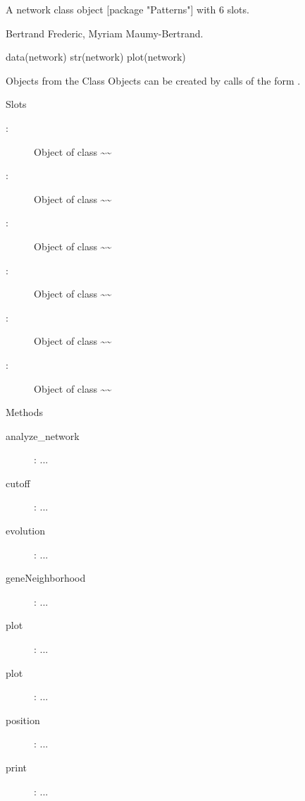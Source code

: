 \documentclass[a4paper]{book}
\begin{document}
%
\begin{Details}\relax
A network class object [package "Patterns"] with 6 slots.
\end{Details}
%
\begin{Author}\relax
Bertrand Frederic, Myriam Maumy-Bertrand.
\end{Author}
%
\begin{Examples}
\begin{ExampleCode}
data(network)
str(network)
plot(network)
\end{ExampleCode}
\end{Examples}
%
\begin{Description}
\end{Description}
%
\begin{Section}{Objects from the Class}
Objects can be created by calls of the form .
\end{Section}
%
\begin{Section}{Slots}
\begin{description}

\item[:] Object of class  \textasciitilde{}\textasciitilde{} 
\item[:] Object of class  \textasciitilde{}\textasciitilde{} 
\item[:] Object of class  \textasciitilde{}\textasciitilde{} 
\item[:] Object of class  \textasciitilde{}\textasciitilde{} 
\item[:] Object of class  \textasciitilde{}\textasciitilde{} 
\item[:] Object of class  \textasciitilde{}\textasciitilde{} 

\end{description}

\end{Section}
%
\begin{Section}{Methods}
\begin{description}

\item[analyze\_network] : ... 
\item[cutoff] : ... 
\item[evolution] : ... 
\item[geneNeighborhood] : ... 
\item[plot] : ... 
\item[plot] : ... 
\item[position] : ... 
\item[print] : ... 

\end{description}

\end{Section}
\end{document}
